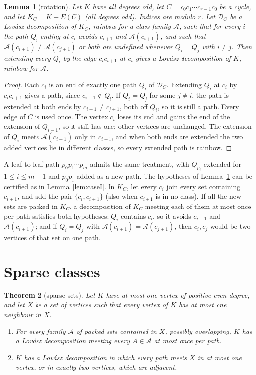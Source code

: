 \documentclass[11pt]{amsart}
\newtheorem{theorem}{Theorem}
\newtheorem{lemma}[theorem]{Lemma}
\theoremstyle{definition}
\newcommand{\cA}{\mathcal A}
\newcommand{\cD}{\mathcal D}
\begin{document}
\begin{lemma}[rotation]\label{lem:rotation}
Let $K$ have all degrees odd, let $C=c_0c_1\cdots c_{r-1}c_0$ be a cycle, and let $K_C=K-E(C)$ (all degrees
odd). Indices are modulo $r$. Let $\cD_C$ be a Lov\'asz decomposition of $K_C$, rainbow for a class family
$\cA$, such that for every $i$ the path $Q_i$ ending at $c_i$ avoids $c_{i+1}$ and $\cA(c_{i+1})$, and such
that $\cA(c_{i+1})\ne\cA(c_{j+1})$ or both are undefined whenever $Q_i=Q_j$ with $i\ne j$. Then extending
every $Q_i$ by the edge $c_ic_{i+1}$ at $c_i$ gives a Lov\'asz decomposition of $K$, rainbow for $\cA$.
\end{lemma}

\begin{proof}
Each $c_i$ is an end of exactly one path $Q_i$ of $\cD_C$. Extending $Q_i$ at $c_i$ by $c_ic_{i+1}$ gives a
path, since $c_{i+1}\notin Q_i$. If $Q_i=Q_j$ for some $j\ne i$, the path is extended at both ends by
$c_{i+1}\ne c_{j+1}$, both off $Q_i$, so it is still a path. Every edge of $C$ is used once. The vertex $c_i$
loses its end and gains the end of the extension of $Q_{i-1}$, so it still has one; other vertices are
unchanged. The extension of $Q_i$ meets $\cA(c_{i+1})$ only in $c_{i+1}$, and when both ends are extended
the two added vertices lie in different classes, so every extended path is rainbow.
\end{proof}

A leaf-to-leaf path $p_0p_1\cdots p_m$ admits the same treatment, with $Q_{p_i}$ extended for $1\le i\le
m-1$ and $p_0p_1$ added as a new path. The hypotheses of Lemma~\ref{lem:rotation} can be certified as in
Lemma~\ref{lem:caseI}. In $K_C$, let every $c_i$ join every set containing $c_{i+1}$, and add the pair
$\{c_i,c_{i+1}\}$ (also when $c_{i+1}$ is in no class). If all the new sets are packed in $K_C$, a
decomposition of $K_C$ meeting each of them at most once per path satisfies both hypotheses: $Q_i$ contains
$c_i$, so it avoids $c_{i+1}$ and $\cA(c_{i+1})$; and if $Q_i=Q_j$ with $\cA(c_{i+1})=\cA(c_{j+1})$, then
$c_i,c_j$ would be two vertices of that set on one path.

\section{Sparse classes}\label{sec:sparse}

\begin{theorem}[sparse sets]\label{thm:sparse}
Let $K$ have at most one vertex of positive even degree, and let $X$ be a set of vertices such that every
vertex of $K$ has at most one neighbour in $X$.
\begin{enumerate}
\item[(i)] For every family $\cA$ of packed sets contained in $X$, possibly overlapping, $K$ has a Lov\'asz
decomposition meeting every $A\in\cA$ at most once per path.
\item[(ii)] $K$ has a Lov\'asz decomposition in which every path meets $X$ in at most one vertex, or in
exactly two vertices, which are adjacent.
\end{enumerate}
\end{theorem}
\end{document}
